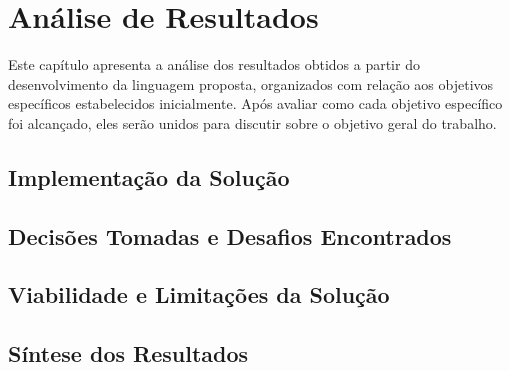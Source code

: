 \chapter{Análise de Resultados} \label{ch:analise_resultados}

Este capítulo apresenta a análise dos resultados obtidos a partir do desenvolvimento da linguagem proposta, organizados com relação aos objetivos específicos estabelecidos inicialmente. Após avaliar como cada objetivo específico foi alcançado, eles serão unidos para discutir sobre o objetivo geral do trabalho.

\section{Implementação da Solução}

\section{Decisões Tomadas e Desafios Encontrados}

\section{Viabilidade e Limitações da Solução}

\section{Síntese dos Resultados}

